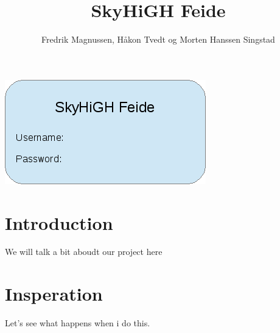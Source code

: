 \documentclass[12pt,a4paper]{article}
\begin{document}
\title{SkyHiGH Feide}
\author{Fredrik Magnussen, Håkon Tvedt og Morten Hanssen Singstad}
\maketitle 
\begin{center}
\includegraphics[scale=1]{frontpageimage.png}
\end{center}

\newpage
\tableofcontents


\newpage
\section{Introduction}
We will talk a bit aboudt our project here

\section{Insperation}
Let's see what happens when i do this.
\end{document}
